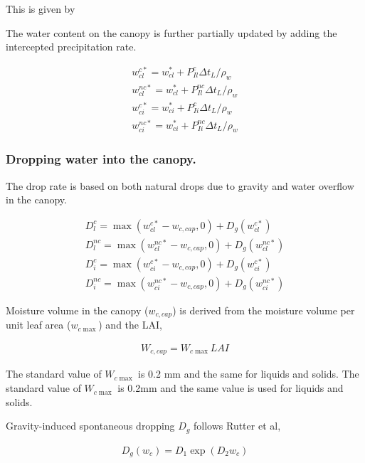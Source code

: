 This is given by

The water content on the canopy is further partially updated by adding
the intercepted precipitation rate.

\begin{eqnarray}
 w_{cl}^{c*} = w_{cl}^*  + P_{Il}^c    \Delta t_L / \rho_w \\
 w_{cl}^{nc*}= w_{cl}^*  + P_{Il}^{nc} \Delta t_L / \rho_w \\
 w_{ci}^{c*} = w_{ci}^*  + P_{Ii}^c    \Delta t_L / \rho_w \\
 w_{ci}^{nc*}= w_{ci}^*  + P_{Ii}^{nc} \Delta t_L / \rho_w
\end{eqnarray}

\hypertarget{dropping-water-into-the-canopy.}{%
\subsubsection{Dropping water into the
canopy.}\label{dropping-water-into-the-canopy.}}

The drop rate is based on both natural drops due to gravity and water
overflow in the canopy.

\begin{eqnarray}
 D_l^c     =  \max( w_{cl}^{c*} - w_{c,cap}, 0 ) + D_{g}(w_{cl}^{c*}) \\
 D_l^{nc}  =  \max( w_{cl}^{nc*}- w_{c,cap}, 0 ) + D_{g}(w_{cl}^{nc*}) \\
 D_i^c     =  \max( w_{ci}^{c*} - w_{c,cap}, 0 ) + D_{g}(w_{ci}^{c*}) \\
 D_i^{nc}  =  \max( w_{ci}^{nc*}- w_{c,cap}, 0 ) + D_{g}(w_{ci}^{nc*})
\end{eqnarray}

Moisture volume in the canopy (\(w_{c,cap}\)) is derived from the
moisture volume per unit leaf area (\(w_{c\max}\)) and the LAI,

\begin{eqnarray}
 W_{c,cap} = W_{c\max} LAI
\end{eqnarray}

The standard value of \(W_{c\max}\) is 0.2 mm and the same for liquids
and solids. The standard value of \(W_{c\max}\) is 0.2mm and the same
value is used for liquids and solids.

Gravity-induced spontaneous dropping \(D_g\) follows Rutter et al,

\begin{eqnarray}
 D_g(w_c) = D_1 \exp(D_2 w_c)
\end{eqnarray}

